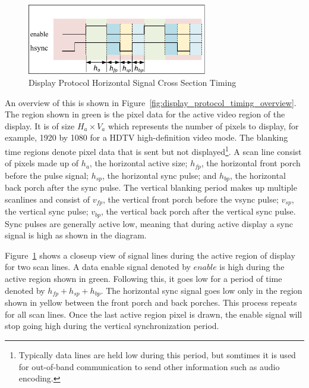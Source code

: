     \begin{figure}
        \centering
        \includegraphics[width=0.7\textwidth]{fig/display_timing_line_cross.pdf}
        \caption{Display Protocol Horizontal Signal Cross Section Timing}
        \label{fig:display_protocol_line_cross}
    \end{figure}


    An overview of this is shown in Figure~\ref{fig:display_protocol_timing_overview}. The region shown in green is the pixel data for the active video region of the display. It is of size $H_a\times V_a$ which represents the number of pixels to display, for example, 1920 by 1080 for a HDTV high-definition video mode\cite{MythTVWebsite}. The blanking time regions denote pixel data that is sent but not displayed\footnote{Typically data lines are held low during this period, but somtimes it is used for out-of-band communication to send other information such as audio encoding.}. A scan line consist of pixels made up of $h_a$, the horizontal active size; $h_{fp}$, the horizontal front porch before the pulse signal; $h_{sp}$, the horizontal sync pulse; and $h_{bp}$, the horizontal back porch after the sync pulse. The vertical blanking period makes up multiple scanlines and consist of $v_{fp}$, the vertical front porch before the vsync pulse; $v_{sp}$, the vertical sync pulse; $v_{bp}$, the vertical back porch after the vertical sync pulse. Sync pulses are generally active low, meaning that during active display a sync signal is high as shown in the diagram.

    Figure~\ref{fig:display_protocol_line_cross} shows a closeup view of signal lines during the active region of display for two scan lines. A data enable signal denoted by $enable$ is high during the active region shown in green. Following this, it goes low for a period of time denoted by $h_{fp}+h_{sp}+h_{bp}$. The horizontal sync signal goes low only in the region shown in yellow between the front porch and back porches. This process repeats for all scan lines. Once the last active region pixel is drawn, the enable signal will stop going high during the vertical synchronization period.

